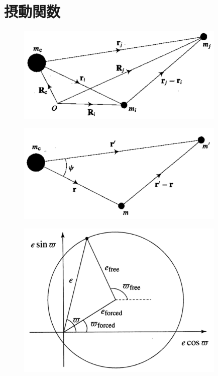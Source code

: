 \documentclass[11pt,a4paper,oneside,onecolumn]{jarticle}
\begin{document}
\section{摂動関数}

\begin{figure}[H]
\centering
\includegraphics[width=10cm]{./image/sec6_1.pdf}
\caption{\label{}}
\end{figure}

\begin{figure}[H]
\centering
\includegraphics[width=10cm]{./image/sec6_2.pdf}
\caption{\label{}}
\end{figure}


\begin{figure}[H]
\centering
\includegraphics[width=10cm]{./image/sec7_2.pdf}
\caption{\label{}}
\end{figure}
\end{document}
